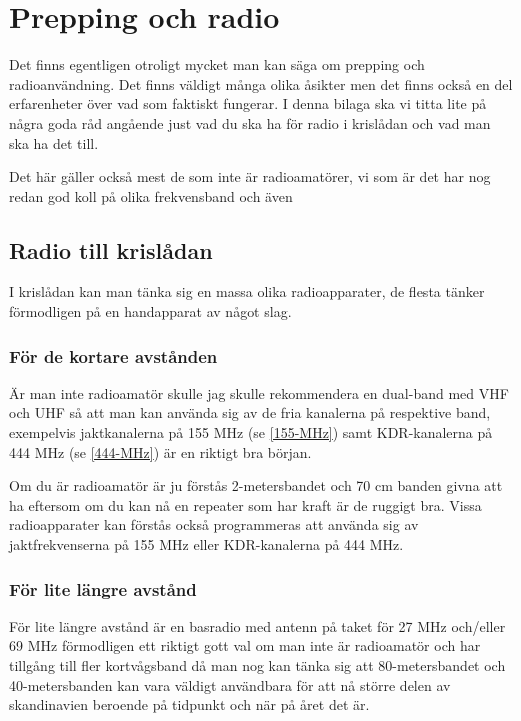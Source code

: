 
\appendix

\chapter{Prepping och radio}

Det finns egentligen otroligt mycket man kan säga om prepping och
radioanvändning. Det finns väldigt många olika åsikter men det finns också en
del erfarenheter över vad som faktiskt fungerar. I denna bilaga ska vi titta
lite på några goda råd angående just vad du ska ha för radio i krislådan och
vad man ska ha det till.

Det här gäller också mest de som inte är radioamatörer, vi som är det har nog
redan god koll på olika frekvensband och även

\vfill \minitoc \clearpage

\section{Radio till krislådan}

I krislådan kan man tänka sig en massa olika radioapparater, de flesta tänker
förmodligen på en handapparat av något slag.

\subsection{För de kortare avstånden}

Är man inte radioamatör skulle jag skulle rekommendera en dual-band med VHF
och UHF så att man kan använda sig av de fria kanalerna på respektive band,
exempelvis jaktkanalerna på 155 MHz (se \ref{155-MHz})  samt KDR-kanalerna på
444 MHz (se \ref{444-MHz}) är en riktigt bra början.

Om du är radioamatör är ju förstås 2-metersbandet och 70 cm banden givna att
ha eftersom om du kan nå en repeater som har kraft är de ruggigt bra. Vissa
radioapparater kan förstås också programmeras att använda sig av
jaktfrekvenserna på 155 MHz eller KDR-kanalerna på 444 MHz.

\subsection{För lite längre avstånd}

För lite längre avstånd är en basradio med antenn på taket för 27 MHz
och/eller 69 MHz förmodligen ett riktigt gott val om man inte är radioamatör
och har tillgång till fler kortvågsband då man nog kan tänka sig att
80-metersbandet och 40-metersbanden kan vara väldigt användbara för att nå
större delen av skandinavien beroende på tidpunkt och när på året det är.

